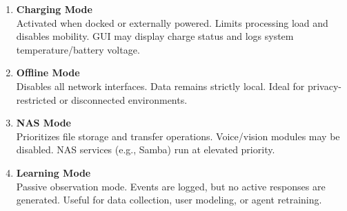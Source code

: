 \begin{enumerate}
    \item \textbf{Charging Mode} \\
    Activated when docked or externally powered. Limits processing load and disables mobility. GUI may display charge status and logs system temperature/battery voltage.

    \item \textbf{Offline Mode} \\
    Disables all network interfaces. Data remains strictly local. Ideal for privacy-restricted or disconnected environments.

    \item \textbf{NAS Mode} \\
    Prioritizes file storage and transfer operations. Voice/vision modules may be disabled. NAS services (e.g., Samba) run at elevated priority.

    \item \textbf{Learning Mode} \\
    Passive observation mode. Events are logged, but no active responses are generated. Useful for data collection, user modeling, or agent retraining.
\end{enumerate}
